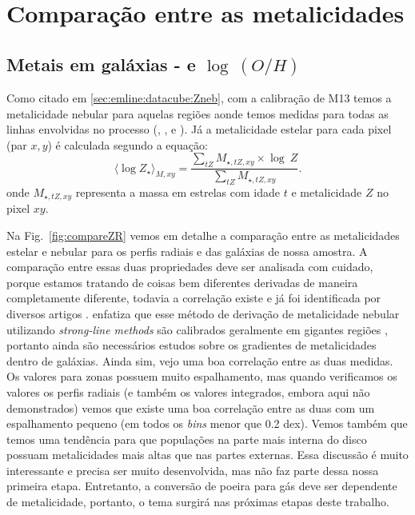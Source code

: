 
\section{Comparação entre as metalicidades}
\label{sec:synvsneb:Z}

\subsection{Metais em galáxias -  e $\log\ (O/H)$}
\label{sec:synvsneb:ZemuZR}

Como citado em \ref{sec:emline:datacube:Zneb}, com a calibração de M13 temos a metalicidade nebular
para aquelas regiões aonde temos medidas para todas as linhas envolvidas no processo (\Hbeta, \oIII,
\Halpha e \nII). Já a metalicidade estelar para cada pixel (par $x,y$) é calculada segundo a
equação:
\begin{equation}
 	\label{eq:logZmass}
 	\langle \log Z_\star \rangle_{M,xy} = 
	\frac{ \sum_{tZ} M_{\star,tZ,xy} \times \log\ Z}{
	\sum_{tZ} M_{\star,tZ,xy} }.
\end{equation}
\noindent onde $M_{\star,tZ,xy}$ representa a massa em estrelas com idade $t$ e metalicidade $Z$ no
pixel $xy$. 

Na Fig.\ \ref{fig:compareZR} vemos em detalhe a comparação entre as metalicidades estelar e nebular
para os perfis radiais e das galáxias de nossa amostra. A comparação entre essas duas propriedades
deve ser analisada com cuidado, porque estamos tratando de coisas bem diferentes derivadas de
maneira completamente diferente, todavia a correlação existe e já foi identificada por diversos
artigos \citep{CidFernandes.etal.2005a, Gallazzi.etal.2005a, CidFernandes.etal.2007a,
Asari.etal.2007a}. \citet{Stasinska.etal.2006a} enfatiza que esse método de derivação de
metalicidade nebular utilizando {\em strong-line methods} são calibrados geralmente em gigantes
regiões \Hii, portanto ainda são necessários estudos sobre os gradientes de metalicidades dentro de
galáxias. Ainda sim, vejo uma boa correlação entre as duas medidas. Os valores para zonas possuem
muito espalhamento, mas quando verificamos os valores os perfis radiais (e também os valores
integrados, embora aqui não demonstrados) vemos que existe uma boa correlação entre as duas com um
espalhamento pequeno (em todos os {\em bins} menor que 0.2 dex). Vemos também que temos uma
tendência para que populações na parte mais interna do disco possuam metalicidades mais altas que
nas partes externas. Essa discussão é muito interessante e precisa ser muito desenvolvida, mas não
faz parte dessa nossa primeira etapa. Entretanto, a conversão de poeira para gás deve ser dependente
de metalicidade, portanto, o tema surgirá nas próximas etapas deste trabalho.

